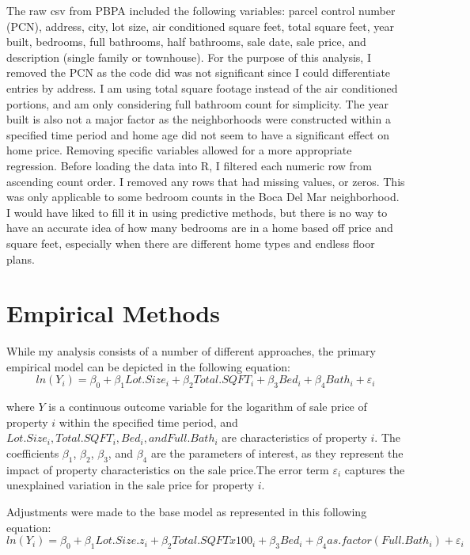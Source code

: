 \documentclass[12pt,english]{article}
\begin{document}
The raw csv from PBPA included the following variables: parcel control number (PCN), address, city, lot size, air conditioned square feet, total square feet, year built, bedrooms, full bathrooms, half bathrooms, sale date, sale price, and description (single family or townhouse). For the purpose of this analysis, I removed the PCN as the code did was not significant since I could differentiate entries by address. I am using total square footage instead of the air conditioned portions, and am only considering full bathroom count for simplicity. The year built is also not a major factor as the neighborhoods were constructed within a specified time period and home age did not seem to have a significant effect on home price. Removing specific variables allowed for a more appropriate regression. Before loading the data into R, I filtered each numeric row from ascending count order. I removed any rows that had missing values, or zeros. This was only applicable to some bedroom counts in the Boca Del Mar neighborhood. I would have liked to fill it in using predictive methods, but there is no way to have an accurate idea of how many bedrooms are in a home based off price and square feet, especially when there are different home types and endless floor plans.  



\section{Empirical Methods}\label{sec:methods}
While my analysis consists of a number of different approaches, the primary empirical model can be depicted in the following equation:
\begin{equation}
\label{eq:1}
ln(Y_i) = \beta_{0} + \beta_{1}Lot.Size_i + \beta_{2}Total.SQFT_i + \beta_{3}Bed_i + \beta_{4}Bath_i + \varepsilon_i
\end{equation}


where $Y$ is a continuous outcome variable for the logarithm of sale price of property $i$ within the specified time period, and $Lot.Size_i, Total.SQFT_i, Bed_i, and Full.Bath_i$ are characteristics of property $i$.  
The coefficients $\beta_{1}$, $\beta_{2}$, $\beta_{3}$, and $\beta_{4}$ are the parameters of interest, as they represent the impact of property characteristics on the sale price.The error term $\varepsilon_i$ captures the unexplained variation in the sale price for property $i$. 


Adjustments were made to the base model as represented in this following equation: 
\begin{equation}
\label{eq:2}
ln(Y_i) = \beta_{0} + \beta_{1}Lot.Size.z_i + \beta_{2}Total.SQFTx100_i + \beta_{3}Bed_i + \beta_{4}as.factor(Full.Bath_i) + \varepsilon_i
\end{equation}
\end{document}
